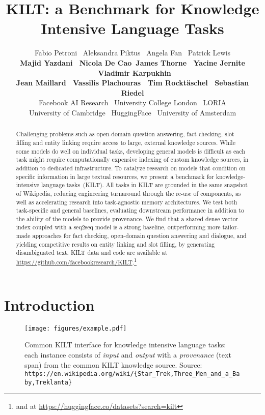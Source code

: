 \documentclass[11pt]{article}
\title{KILT: a Benchmark for Knowledge Intensive Language Tasks}
\author{
Fabio Petroni\fair{} \
Aleksandra Piktus\fair{} \
Angela Fan\loriafair{} \
Patrick Lewis\uclfair{} \\
{\bf Majid Yazdani\fair{} \ Nicola De Cao\uva \  James Thorne\cambridge{} \ Yacine Jernite\hf{} \ Vladimir Karpukhin\fair{} } \\ 
{\bf Jean Maillard\fair{} \ Vassilis Plachouras\fair{} \ Tim Rockt\"aschel\uclfair{} \ Sebastian Riedel\uclfair{} } \\
\fair{}Facebook AI Research \ \ucl{}University College London \ \loria{}LORIA\\
\cambridge{}University of Cambridge \ \hf{}HuggingFace \ \uva{}University of Amsterdam
}
\date{}
\begin{document}
\maketitle
\begin{abstract}
 Challenging problems such as open-domain question answering, fact checking, slot filling and entity linking require access to large, external knowledge sources.  
While some models do well on individual tasks, developing general models 
is difficult as each task might require computationally expensive indexing of custom knowledge sources, in addition to dedicated infrastructure.
To catalyze research on models that condition on specific information in large textual resources, we present a benchmark for knowledge-intensive language tasks~(KILT). 
All tasks in KILT are grounded in the same snapshot of Wikipedia, reducing engineering turnaround through the re-use of components, as well as accelerating research into task-agnostic memory architectures.
We test both task-specific and general baselines, 
evaluating downstream performance in addition to the ability of the models to provide provenance.
We find that a shared dense vector index coupled with a seq2seq model is a strong baseline, outperforming more tailor-made approaches for fact checking, open-domain question answering and dialogue, and yielding competitive results on entity linking and slot filling, by generating disambiguated text. KILT data and code are available at \url{https://github.com/facebookresearch/KILT}.\footnote{and at \url{https://huggingface.co/datasets?search=kilt}} \end{abstract}





\section{Introduction}





\begin{figure*}[t!]
    \centering
    \texttt{[image: figures/example.pdf]}
    \caption{Common KILT interface for knowledge intensive language tasks: each instance consists of \textit{input} and \textit{output} with a \textit{provenance} (text span) from the common KILT knowledge source. Source: \texttt{https://en.wikipedia.org/wiki/\{Star\_Trek,Three\_Men\_and\_a\_Baby,Treklanta\}
    }}
    
    \label{fig:example}
\end{figure*}
\end{document}
